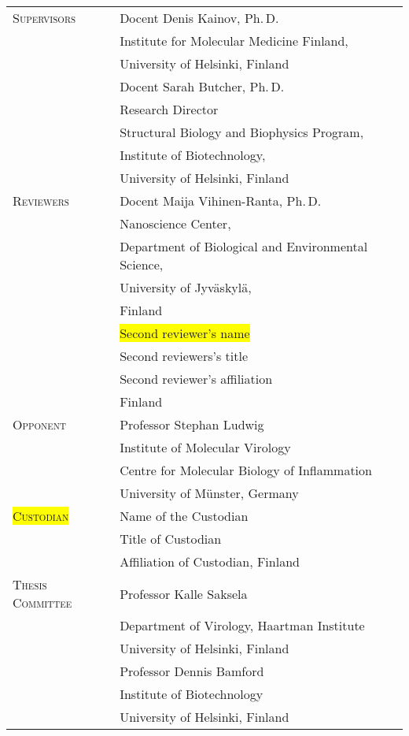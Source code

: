 \documentclass[a4paper,12pt]{article} %
\begin{document}
	\begin{tabular}{p{4.5cm}l}
		\textsc{Supervisors} & Docent Denis Kainov, Ph.\,D.\\
		& Institute for Molecular Medicine Finland,\\
		& University of Helsinki, Finland \\
	\rule[0.6 cm]{0pt}{0pt}	& Docent Sarah Butcher, Ph.\,D.\\
		& Research Director \\
		& Structural Biology and Biophysics Program,\\
		& Institute of Biotechnology,\\
		& University of Helsinki, Finland\\
	\rule[1 cm]{0pt}{0pt}	\textsc{Reviewers} & Docent Maija Vihinen-Ranta, Ph.\,D. \\
		& Nanoscience Center, \\
		& Department of  Biological and Environmental Science, \\
		& University of Jyväskylä, \\
		& Finland \\
	\rule[0.6 cm]{0pt}{0pt}	& \fboxsep=0pt\colorbox{yellow}{Second reviewer's name} \\
		& Second reviewers's title \\
		& Second reviewer's affiliation \\
		& Finland \\
	\rule[1 cm]{0pt}{0pt}	\textsc{Opponent} & Professor Stephan Ludwig \\
		& Institute of Molecular Virology \\
		& Centre for Molecular Biology of Inflammation \\
		& University of M\"{u}nster, Germany \\
	\rule[1 cm]{0pt}{0pt}	\fboxsep=0pt\colorbox{yellow}{\textsc{Custodian}} & Name of the Custodian \\
		& Title of Custodian \\
		& Affiliation of Custodian, Finland \\
	\rule[1 cm]{0pt}{0pt} \textsc{Thesis Committee} & Professor Kalle Saksela \\
		& Department of Virology, Haartman Institute \\
		& University of Helsinki, Finland \\
	\rule[0.6 cm]{0pt}{0pt}	& Professor Dennis Bamford \\
		& Institute of Biotechnology \\
		& University of Helsinki, Finland\\
	\end{tabular} 
\end{document}
